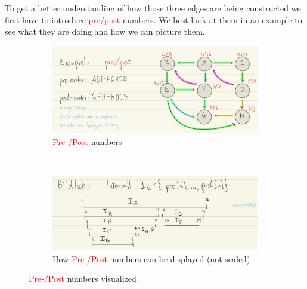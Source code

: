 \documentclass[a4paper]{article}
\begin{document}
    To get a better understanding of how those three edges are being constructed we first have to introduce \textcolor{red}{pre/post}-numbers. We best look at them in an example to see what they are doing and how we can picture them. 
\begin{figure}[h]
    \begin{subfigure}{1\textwidth}
        \centering
        \includegraphics[scale = 0.7, width=\textwidth]{Pictures/PrePost.png}
        \caption{\textcolor{red}{Pre-/Post} numbers}
        \label{fig:Pre/PostNumbers}
        \end{subfigure}
    \hfill \\
    \begin{subfigure}{1\textwidth}
        \centering
        \includegraphics[scale = 0.7, width=\textwidth]{Pictures/PrePostIntrval.png}
         \caption{How \textcolor{red}{Pre-/Post} numbers can be displayed (not scaled)}
        \label{fig:DFS-End}
    \end{subfigure}
\caption{\textcolor{red}{Pre-/Post} numbers visualized}
\label{fig:BFS-Veranschaulichung}
\end{figure}
\end{document}
